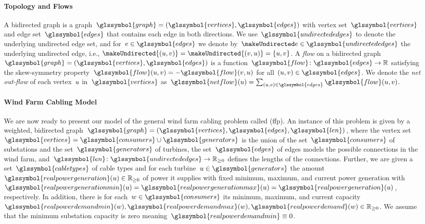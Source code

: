 \paragraph{Topology and Flows}
\label{ch:wfcp:sec:model:para:topology-and-flows}
% 
A bidirected graph is a graph~$\glssymbol{graph} = (\glssymbol{vertices},
\glssymbol{edges})$ with vertex set~$\glssymbol{vertices}$ and edge
set~$\glssymbol{edges}$ that contains each edge in both directions.  We
use~$\glssymbol{undirectededges}$ to denote the underlying undirected edge set,
and for~$\edge \in \glssymbol{edges}$ we denote by~$\undirectededge \in
\glssymbol{undirectededges}$ the underlying undirected edge, i.e.,
$\makeUndirected{(\vertexa,\vertexb)} = \makeUndirected{(\vertexb, \vertexa)} =
\{\vertexa, \vertexb\}$. A \emph{flow} on a bidirected graph~$\glssymbol{graph}
= (\glssymbol{vertices}, \glssymbol{edges})$ is a function~$\glssymbol{flow}
\colon \glssymbol{edges} \to \reals$ satisfying the skew-symmetry property~$
\glssymbol{flow}(\vertexa, \vertexb) =  -\glssymbol{flow}(\vertexb,\vertexa)$
for all~\mbox{$(\vertexa,\vertexb) \in \glssymbol{edges}$}. We denote the
\emph{net out-flow} of each vertex~$u$ in~$\glssymbol{vertices}$
as~$\glssymbol{netflow}(\vertexa)=\sum_{(\vertexa,\vertexb) \in
\glssymbol{edges}}\glssymbol{flow}(\vertexa,\vertexb)$.
% 
\paragraph{Wind Farm Cabling Model}
\label{ch:wfcp:sec:model:para:wind-farm-cabling-model}
% 
We are now ready to present our model of the general wind farm cabling problem
called  (\gls{ffp}).  An instance of this problem is given
by a weighted, bidirected graph~$
\glssymbol{graph} 
= (
\glssymbol{vertices},
\glssymbol{edges}, 
\glssymbol{len}
)$, where the vertex set~$\glssymbol{vertices} = \glssymbol{consumers} \cup
\glssymbol{generators}$ is the union of the set~$\glssymbol{consumers}$ of
substations and the set~$\glssymbol{generators}$ of turbines, the
set~$\glssymbol{edges}$ of edges models the possible connections in the wind
farm, and~$\glssymbol{len} \colon
\glssymbol{undirectededges} \to \posreals$ defines the lengths of the
connections. Further, we are given a set~$\glssymbol{cabletypes}$ of cable types
and for each turbine~$\vertexa \in \glssymbol{generators}$ the amount~$
\glssymbol{realpowergeneration}
(\vertexa)
\in \posreals$ of power it supplies with fixed minimum, maximum, and
current power generation with~$
\glssymbol{realpowergenerationmin}(\vertexa)
= 
\glssymbol{realpowergenerationmax}(\vertexa) 
= 
\glssymbol{realpowergeneration}(\vertexa)$, respectively. In addition, there is
for each~$
\vertexc
\in
\glssymbol{consumers}$ its minimum, maximum, and current 
capacity~$
\glssymbol{realpowerdemandmin}(\vertexc),
\glssymbol{realpowerdemandmax}(\vertexc),
\glssymbol{realpowerdemand}(\vertexc) 
\in 
\posreals$. We assume that the minimum substation capacity is zero meaning~$
\glssymbol{realpowerdemandmin} \equiv 0$.
 
